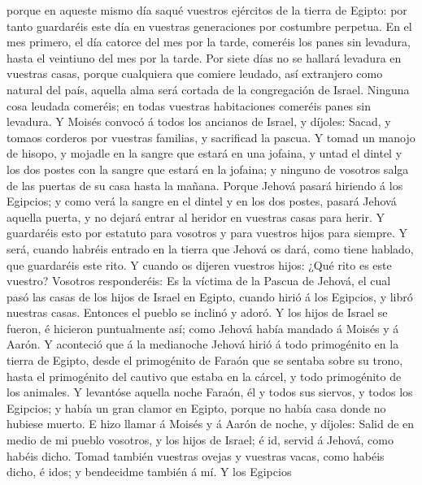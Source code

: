 porque en aqueste mismo día saqué vuestros ejércitos de la tierra de
Egipto: por tanto guardaréis este día en vuestras generaciones por
costumbre perpetua.  En el mes primero, el día catorce
del mes por la tarde, comeréis los panes sin levadura, hasta el
veintiuno del mes por la tarde.  Por siete días no se
hallará levadura en vuestras casas, porque cualquiera que comiere
leudado, así extranjero como natural del país, aquella alma será cortada
de la congregación de Israel.  Ninguna cosa leudada
comeréis; en todas vuestras habitaciones comeréis panes sin levadura.
 Y Moisés convocó á todos los ancianos de Israel, y
díjoles: Sacad, y tomaos corderos por vuestras familias, y sacrificad la
pascua.  Y tomad un manojo de hisopo, y mojadle en la
sangre que estará en una jofaina, y untad el dintel y los dos postes con
la sangre que estará en la jofaina; y ninguno de vosotros salga de las
puertas de su casa hasta la mañana.  Porque Jehová pasará
hiriendo á los Egipcios; y como verá la sangre en el dintel y en los dos
postes, pasará Jehová aquella puerta, y no dejará entrar al heridor en
vuestras casas para herir.  Y guardaréis esto por
estatuto para vosotros y para vuestros hijos para siempre.
 Y será, cuando habréis entrado en la tierra que Jehová
os dará, como tiene hablado, que guardaréis este rito.  Y
cuando os dijeren vuestros hijos: ¿Qué rito es este vuestro?
 Vosotros responderéis: Es la víctima de la Pascua de
Jehová, el cual pasó las casas de los hijos de Israel en Egipto, cuando
hirió á los Egipcios, y libró nuestras casas. Entonces el pueblo se
inclinó y adoró.  Y los hijos de Israel se fueron, é
hicieron puntualmente así; como Jehová había mandado á Moisés y á Aarón.
 Y aconteció que á la medianoche Jehová hirió á todo
primogénito en la tierra de Egipto, desde el primogénito de Faraón que
se sentaba sobre su trono, hasta el primogénito del cautivo que estaba
en la cárcel, y todo primogénito de los animales.  Y
levantóse aquella noche Faraón, él y todos sus siervos, y todos los
Egipcios; y había un gran clamor en Egipto, porque no había casa donde
no hubiese muerto.  E hizo llamar á Moisés y á Aarón de
noche, y díjoles: Salid de en medio de mi pueblo vosotros, y los hijos
de Israel; é id, servid á Jehová, como habéis dicho. 
Tomad también vuestras ovejas y vuestras vacas, como habéis dicho, é
idos; y bendecidme también á mí.  Y los Egipcios
